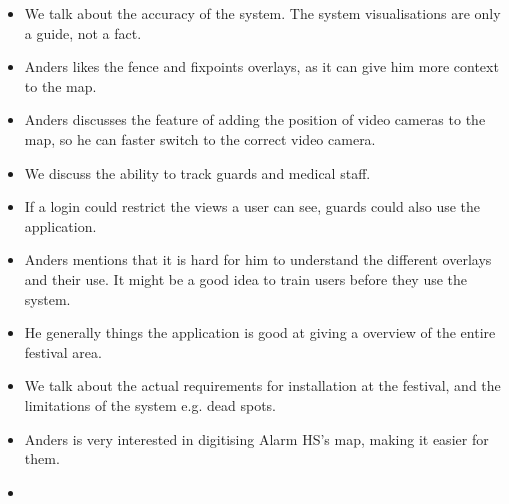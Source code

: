 \begin{itemize}
    \item We talk about the accuracy of the system. The system visualisations are only a guide, not a fact.
    \item Anders likes the fence and fixpoints overlays, as it can give him more context to the map.
    \item Anders discusses the feature of adding the position of video cameras to the map, so he can faster switch to the correct video camera.
    \item We discuss the ability to track guards and medical staff.
    \item If a login could restrict the views a user can see, guards could also use the application.
    \item Anders mentions that it is hard for him to understand the different overlays and their use. It might be a good idea to train users before they use the system.
    \item He generally things the application is good at giving a overview of the entire festival area.
    \item We talk about the actual requirements for installation at the festival, and the limitations of the system e.g. dead spots.
    \item Anders is very interested in digitising Alarm HS's map, making it easier for them.
    \item 
\end{itemize}